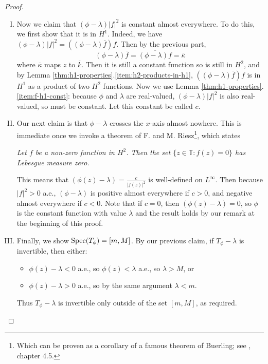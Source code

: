 \documentclass[../main.tex]{subfiles}
\begin{document}
\begin{proof}
\begin{enumerate}[I.]
\item Now we claim that $(\phi - \lambda)|f|^2$ is constant almost everywhere. To do this, we first show that it is in $H^1$. Indeed, we have
$(\phi - \lambda)|f|^2 = ((\phi - \lambda)\overline{f}) f$. Then by the previous part, $$(\phi - \lambda)\overline{f} = \overline{(\phi - \lambda)f} = \overline{\kappa}$$
where $\overline{\kappa}$ maps $z$ to $\overline{k}$. Then it is still a constant function so is still in $H^2$, and by Lemma \ref{thm:h1-properties}.\ref{item:h2-products-in-h1}, $((\phi - \lambda)\overline{f}) f$ is in $H^1$ as a product of two $H^2$ functions. Now we use Lemma \ref{thm:h1-properties}.\ref{item:f-h1-const}: because $\phi$ and $\lambda$ are real-valued, $(\phi - \lambda)|f|^2$ is also real-valued, so must be constant. Let this constant be called $c$.
\item Our next claim is that $\phi - \lambda$ crosses the $x$-axis almost nowhere. This is immediate once we invoke a theorem of F. and M. Riesz\footnote{Which can be proven as a corollary of a famous theorem of Buerling; see \parencite{arveson2002short}, chapter 4.5.}, which states
\begin{displayquote}
\emph{Let $f$ be a non-zero function in $H^2$. Then the set $\{z \in \mathbb{T} : f(z) = 0\}$ has Lebesgue measure zero.}
\end{displayquote}
This means that $(\phi(z) - \lambda) = \frac{c}{|f(z)|^2}$ is well-defined on $L^\infty$. Then because $|f|^2 > 0$ a.e., $(\phi - \lambda)$ is positive almost everywhere if $c > 0$, and negative almost everywhere if $c < 0$. Note that if $c = 0$, then $(\phi(z) - \lambda) = 0$, so $\phi$ is the 
constant function with value $\lambda$ and the result holds by our remark at the beginning of this proof.
\item Finally, we show $\mathrm{Spec}(T_\phi) = [m, M]$. By our previous claim, if $T_\phi - \lambda$ is invertible, then either:
\begin{itemize}
\item $\phi(z) - \lambda < 0$ a.e., so $\phi(z) < \lambda$ a.e., so $\lambda > M$, or
\item $\phi(z) - \lambda > 0$ a.e., so by the same argument $\lambda < m$.
\end{itemize}
Thus $T_\phi - \lambda$ is invertible only outside of the set $[m, M]$, as required.
\end{enumerate}
\end{proof}
\end{document}
